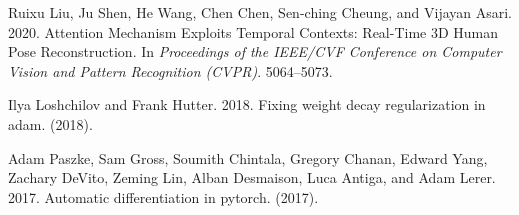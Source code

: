 \documentclass[sigconf]{acmart}
\begin{document}
\begin{multicols}{2}
\begin{thebibliography}{7}



\ifx \showCODEN    \undefined {}     \fi
\ifx \showDOI      \undefined \def \showDOI       #1{#1}\fi
\ifx \showISBNx    \undefined \def \showISBNx     #1{\unskip}     \fi
\ifx \showISBNxiii \undefined \def \showISBNxiii  #1{\unskip}     \fi
\ifx \showISSN     \undefined \def \showISSN      #1{\unskip}     \fi
\ifx \showLCCN     \undefined \def \showLCCN      #1{\unskip}     \fi
\ifx \shownote     \undefined \def \shownote      #1{#1}          \fi
\ifx \showarticletitle \undefined \def \showarticletitle #1{#1}   \fi
\ifx \showURL      \undefined \def \showURL       {\relax}        \fi
\providecommand\bibfield[2]{#2}
\providecommand\bibinfo[2]{#2}
\providecommand\natexlab[1]{#1}
\providecommand\showeprint[2][]{arXiv:#2}

\bibfield{author}{\bibinfo{person}{Ruixu Liu}, \bibinfo{person}{Ju Shen},
  \bibinfo{person}{He Wang}, \bibinfo{person}{Chen Chen},
  \bibinfo{person}{Sen-ching Cheung}, {and} \bibinfo{person}{Vijayan Asari}.}
  \bibinfo{year}{2020}\natexlab{}.
\newblock \showarticletitle{Attention Mechanism Exploits Temporal Contexts:
  Real-Time 3D Human Pose Reconstruction}. In
  \bibinfo{booktitle}{\emph{Proceedings of the IEEE/CVF Conference on Computer
  Vision and Pattern Recognition (CVPR)}}. \bibinfo{pages}{5064--5073}.
\newblock


\bibfield{author}{\bibinfo{person}{Ilya Loshchilov} {and}
  \bibinfo{person}{Frank Hutter}.} \bibinfo{year}{2018}\natexlab{}.
\newblock \showarticletitle{Fixing weight decay regularization in adam}.
\newblock  (\bibinfo{year}{2018}).
\newblock


\bibfield{author}{\bibinfo{person}{Adam Paszke}, \bibinfo{person}{Sam Gross},
  \bibinfo{person}{Soumith Chintala}, \bibinfo{person}{Gregory Chanan},
  \bibinfo{person}{Edward Yang}, \bibinfo{person}{Zachary DeVito},
  \bibinfo{person}{Zeming Lin}, \bibinfo{person}{Alban Desmaison},
  \bibinfo{person}{Luca Antiga}, {and} \bibinfo{person}{Adam Lerer}.}
  \bibinfo{year}{2017}\natexlab{}.
\newblock \showarticletitle{Automatic differentiation in pytorch}.
\newblock  (\bibinfo{year}{2017}).
\newblock



\end{thebibliography}
\end{multicols}
\end{document}
